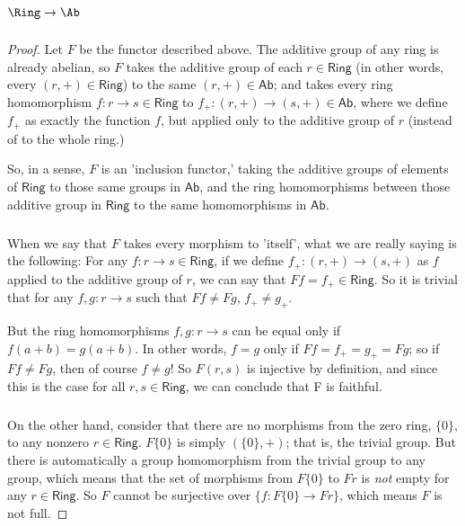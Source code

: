 \documentclass[main.tex]{subfiles}
\begin{document}
\subparagraph{\(\Ring\to\Ab\)}
\begin{proof}
	Let \(F\) be the functor described above. The additive group of any ring is
	already abelian, so \(F\)  takes the additive group of each \(r \in
	\textsf{Ring}\) (in other words, every \((r, +) \in \textsf{Ring}\)) to the
	same \((r, +) \in \textsf{Ab}\); and takes every ring homomorphism \(f
	\colon r \to s \in \textsf{Ring}\) to \(f_+ \colon (r, +) \to (s, +) \in
	\textsf{Ab}\),  where we define \(f_+\) as exactly the function \(f\), but
	applied only to the additive group of \(r\) (instead of to the whole ring.)

	So, in a sense, \(F\) is an 'inclusion functor,' taking the additive groups of
	elements of \(\textsf{Ring}\) to those same groups in \(\textsf{Ab}\), and the
	ring homomorphisms between those additive group in \(\textsf{Ring}\) to the same
	homomorphisms in \(\textsf{Ab}\).


	\subparagraph{}
	When we say that \(F\) takes every morphism to 'itself', what we are really
	saying is the following: For any \(f \colon r \to s \in \textsf{Ring}\), if
	we define \(f_+ \colon (r, +) \to (s, +)\) as \(f\) applied to the additive
	group of \(r\), we can say that \(Ff = f_+\in \textsf{Ring}\). So it is
	trivial that for any \(f, g \colon r \to s\) such that \(Ff \neq Fg\), \(f_+
	\neq g_+\).

	But the ring homomorphisms \(f, g \colon r \to s\) can be equal only if
	\(f(a+b) = g(a+b)\). In other words, \(f = g \) only if \(Ff = f_+ = g_+ =
	Fg\); so if \(Ff \neq Fg\), then of course \(f \neq g \)! So \(F(r, s)\) is
	injective by definition, and since this is the case for all \(r, s \in
	\textsf{Ring}\), we can conclude that F is faithful.


	\subparagraph{}
	On the other hand, consider that there are no morphisms from the zero ring,
	\(\{0\}\), to any nonzero \(r \in \textsf{Ring}\). \(F\{0\}\) is simply
	\((\{0\}, +)\); that is, the trivial group. But there is automatically a
	group homomorphism from the trivial group to any group, which means that the
	set of morphisms from \(F\{0\}\) to \(Fr\) is \textit{not} empty for any \(r
	\in \textsf{Ring}\). So \(F\) cannot be surjective over \(\{f : F\{0\} \to
	Fr\}\), which means \(F\) is not full.


\end{proof}
\end{document}
